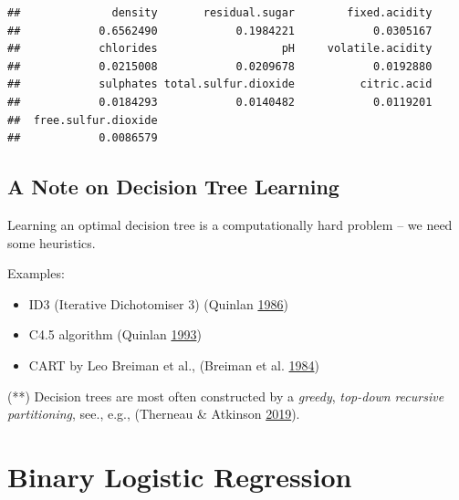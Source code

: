 \documentclass[10pt,b5paper,krantz1]{krantz}
\newenvironment{Shaded}{\begin{snugshade}}{\end{snugshade}}
\newcommand{\KeywordTok}[1]{\textcolor[rgb]{0.27,0.27,0.27}{\textbf{#1}}}
\newcommand{\NormalTok}[1]{#1}
\newcommand{\OperatorTok}[1]{\textcolor[rgb]{0.43,0.43,0.43}{\textbf{#1}}}
\providecommand{\tightlist}{%
  \setlength{\itemsep}{0pt}\setlength{\parskip}{0pt}}
\begin{document}
\begin{Shaded}
\end{Shaded}

\begin{verbatim}
##              density       residual.sugar        fixed.acidity 
##            0.6562490            0.1984221            0.0305167 
##            chlorides                   pH     volatile.acidity 
##            0.0215008            0.0209678            0.0192880 
##            sulphates total.sulfur.dioxide          citric.acid 
##            0.0184293            0.0140482            0.0119201 
##  free.sulfur.dioxide 
##            0.0086579
\end{verbatim}

\hypertarget{a-note-on-decision-tree-learning}{%
\subsection{A Note on Decision Tree Learning}\label{a-note-on-decision-tree-learning}}

Learning an optimal decision tree is a computationally hard problem
-- we need some heuristics.

Examples:

\begin{itemize}
\tightlist
\item
  ID3 (Iterative Dichotomiser 3) (Quinlan \protect\hyperlink{ref-id3}{1986})
\item
  C4.5 algorithm (Quinlan \protect\hyperlink{ref-c45}{1993})
\item
  CART by Leo Breiman et al., (Breiman et al. \protect\hyperlink{ref-cart}{1984})
\end{itemize}

(**) Decision trees are most often constructed by a \emph{greedy}, \emph{top-down}
\emph{recursive partitioning}, see., e.g., (Therneau \& Atkinson \protect\hyperlink{ref-rpart}{2019}).

\hypertarget{binary-logistic-regression}{%
\section{Binary Logistic Regression}\label{binary-logistic-regression}}
\end{document}
